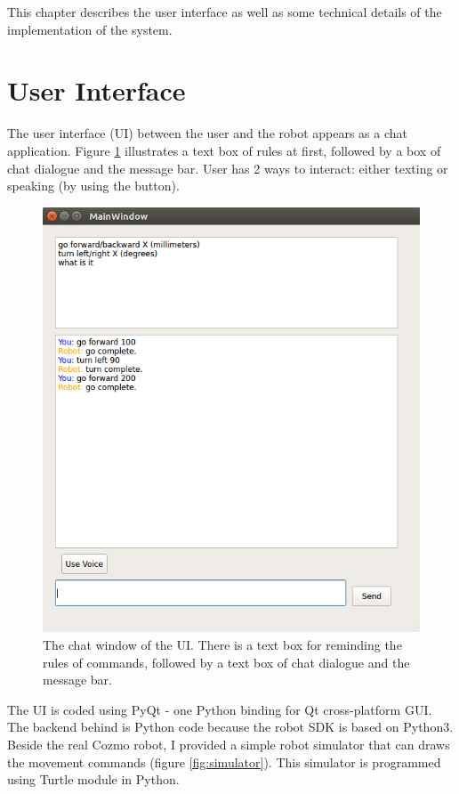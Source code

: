This chapter describes the user interface as well as some technical details of the implementation of the system. 
\section{User Interface}
The user interface (UI) between the user and the robot appears as a chat application. Figure \ref{fig:chatWindow} illustrates a text box of rules at first, followed by a box of chat dialogue and the message bar. User has 2 ways to interact: either texting or speaking (by using the  button). 
\begin{figure}[tb]
	\centering
	\includegraphics[width=0.8\hsize]{./figures/chatWindow}
	\caption{The chat window of the UI. There is a text box for reminding the rules of commands, followed by a text box of chat dialogue and the message bar.}
	\label{fig:chatWindow}
\end{figure}

The UI is coded using PyQt - one Python binding for Qt cross-platform GUI. The backend behind is Python code because the robot SDK is based on Python3. Beside the real Cozmo robot, I provided a simple robot simulator that can draws the movement commands (figure \ref{fig:simulator}). This simulator is programmed using Turtle module in Python.


